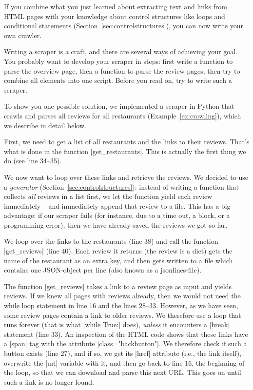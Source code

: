 If you combine what you just learned about extracting text and links from HTML
pages with your knowledge about control structures like loops and conditional
statements (Section~\ref{sec:controlstructures}), you can now write your own crawler.

Writing a scraper is a craft, and there are several ways of achieving your goal.
You probably want to develop your scraper in steps: first write a function to
parse the overview page, then a function to parse the review pages, then try
to combine all elements into one script. Before you read on, try to write
such a scraper.

To show you one possible solution, we implemented a scraper in Python
that crawls and parses all reviews for all restaurants
(Example~\ref{ex:crawling}), which we describe in detail below.


First, we need to get a list of all restaurants and the links to their
reviews. That's what is done in the function |get_restaurants|. This
is actually the first thing we do (see line 34--35).

We now want to loop over these links and retrieve the reviews.  We
decided to use a \emph{generator} (Section~\ref{sec:controlstructures}): instead of writing a
function that collects \emph{all} reviews in a list first, we let the
function yield each review immediately -- and immediately append that review
to a file. This has a big advantage: if our scraper fails (for
instance, due to a time out, a block, or a programming error), then we
have already saved the reviews we got so far.

We loop over the links to the restaurants (line 38) and call the
function |get_reviews| (line 40). Each review it returns (the review
is a  dict) gets the name of the restaurant as an extra key, and then
gets written to a file which contains one JSON-object per line (also
known as a jsonlines-file).

The function |get_reviews| takes a link to a review page as input and
yields reviews. If we knew all pages with reviews already, then we
would not need the while loop statement in line 16 and the lines
28--33. However, as we have seen, some review pages contain a link to
older reviews. We therefore use a loop that runs forever (that is what
|while True:| does), \emph{unless} it encounters a |break| statement
(line 33).  An inspection of the HTML code shows that these links have
a |span| tag with the attribute |class="backbutton"|. We therefore
check if such a button exists (line 27), and if so, we get its |href|
attribute (i.e., the link itself), overwrite the |url| variable with
it, and then go back to line 16, the beginning of the loop, so that we
can download and parse this next URL.  This goes on until such a
link is no longer found.



